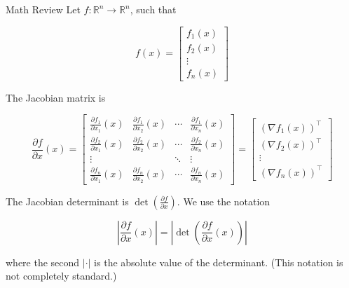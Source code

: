 \begin{frame}[allowframebreaks]

\begin{myconceptblock}{10.14}{Math Review}
    Let $f: \mathbb{R}^{n} \rightarrow \mathbb{R}^{n}$, such that

    $$
    f(x)=\left[\begin{array}{c}
    f_{1}(x) \\
    f_{2}(x) \\
    \vdots \\
    f_{n}(x)
    \end{array}\right]
    $$

    The Jacobian matrix is

    $$
    \frac{\partial f}{\partial x}(x)=\left[\begin{array}{cccc}
    \frac{\partial f_{1}}{\partial x_{1}}(x) & \frac{\partial f_{1}}{\partial x_{2}}(x) & \cdots & \frac{\partial f_{1}}{\partial x_{n}}(x) \\
    \frac{\partial f_{2}}{\partial x_{1}}(x) & \frac{\partial f_{2}}{\partial x_{2}}(x) & \cdots & \frac{\partial f_{2}}{\partial x_{n}}(x) \\
    \vdots & & \ddots & \vdots \\
    \frac{\partial f_{n}}{\partial x_{1}}(x) & \frac{\partial f_{n}}{\partial x_{2}}(x) & \cdots & \frac{\partial f_{n}}{\partial x_{n}}(x)
    \end{array}\right]=\left[\begin{array}{c}
    \left(\nabla f_{1}(x)\right)^{\top} \\
    \left(\nabla f_{2}(x)\right)^{\top} \\
    \vdots \\
    \left(\nabla f_{n}(x)\right)^{\top}
    \end{array}\right]
    $$

    The Jacobian determinant is $\operatorname{det}\left(\frac{\partial f}{\partial x}\right)$. We use the notation

    $$
    \left|\frac{\partial f}{\partial x}(x)\right|=\left|\operatorname{det}\left(\frac{\partial f}{\partial x}(x)\right)\right|
    $$

    where the second $|\cdot|$ is the absolute value of the determinant. (This notation is not completely standard.)
\end{myconceptblock}

\end{frame}

